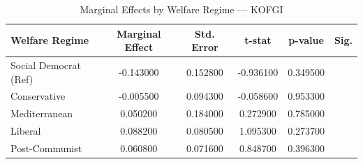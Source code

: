 \begin{table}[htbp]
\caption{Marginal Effects by Welfare Regime — KOFGI}
\label{tab:marginal_effects_KOFGI}
\begin{tabular}{lccccc}
\toprule
Welfare Regime & Marginal Effect & Std. Error & t-stat & p-value & Sig. \\
\midrule
Social Democrat (Ref) & -0.143000 & 0.152800 & -0.936100 & 0.349500 &  \\
Conservative & -0.005500 & 0.094300 & -0.058600 & 0.953300 &  \\
Mediterranean & 0.050200 & 0.184000 & 0.272900 & 0.785000 &  \\
Liberal & 0.088200 & 0.080500 & 1.095300 & 0.273700 &  \\
Post-Communist & 0.060800 & 0.071600 & 0.848700 & 0.396300 &  \\
\bottomrule
\end{tabular}
\end{table}
